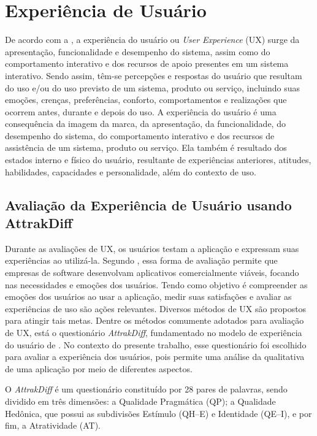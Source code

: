 \section{Experiência de Usuário} 
    \label{ExperienciaUsuario}

De acordo com a , a experiência do usuário ou \textit{User Experience} (UX) surge da apresentação, funcionalidade e desempenho do sistema, assim como do comportamento interativo e dos recursos de apoio presentes em um sistema interativo. Sendo assim, têm-se percepções e respostas do usuário que resultam do uso e/ou do uso previsto de um sistema, produto ou serviço, incluindo suas emoções, crenças, preferências, conforto, comportamentos e realizações que ocorrem antes, durante e depois do uso. A experiência do usuário é uma consequência da imagem da marca, da apresentação, da funcionalidade, do desempenho do sistema, do comportamento interativo e dos recursos de assistência de um sistema, produto ou serviço. Ela também é resultado dos estados interno e físico do usuário, resultante de experiências anteriores, atitudes, habilidades, capacidades e personalidade, além do contexto de uso.

\subsection{Avaliação da Experiência de Usuário usando AttrakDiff} \label{adiff}

Durante as avaliações de UX, os usuários testam a aplicação e expressam suas experiências ao utilizá-la. Segundo , essa forma de avaliação permite que empresas de software desenvolvam aplicativos comercialmente viáveis, focando nas necessidades e emoções dos usuários. Tendo como objetivo é compreender as emoções dos usuários ao usar a aplicação, medir suas satisfações e avaliar as experiências de uso são ações relevantes. Diversos métodos de UX são propostos para atingir tais metas. Dentre os métodos comumente adotados para avaliação de UX, está o questionário \textit{AttrakDiff}, fundamentado no modelo de experiência do usuário de . No contexto do presente trabalho, esse questionário foi escolhido para avaliar a experiência dos usuários, pois permite uma análise da qualitativa de uma aplicação por meio de diferentes aspectos.

O \textit{AttrakDiff} é um questionário constituído por 28 pares de palavras, sendo dividido em três dimensões: a Qualidade Pragmática (QP); a Qualidade Hedônica, que possui as subdivisões Estímulo (QH–E) e Identidade (QE–I), e por fim, a  Atratividade (AT).

